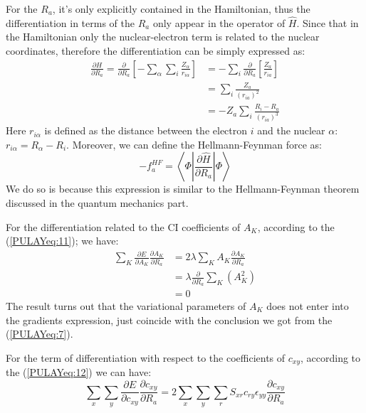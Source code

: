 For the $R_{a}$, it's only explicitly contained in the Hamiltonian,
thus the differentiation in terms of the $R_{a}$ only appear in the
operator of $\hat{H}$. Since that in the Hamiltonian only the
nuclear-electron term is related to the nuclear coordinates, therefore
the differentiation can be simply expressed as:
\begin{align}\label{}
  \frac{\partial \hat{H}}{\partial R_{a}} = \frac{\partial}{\partial
    R_{a}}\left[-\sum_{\alpha}\sum_{i}\frac{Z_{\alpha}}{r_{i\alpha}}\right]
  &=-\sum_{i}\frac{\partial}{\partial
    R_{a}}\left[\frac{Z_{a}}{r_{ia}}\right] \nonumber \\
  &=\sum_{i}\frac{Z_{a}}{(r_{ia})^{2}} \nonumber \\
  &=-Z_{a}\sum_{i}\frac{R_{i} - R_{a}}{(r_{ia})^{3}}
\end{align}
Here $r_{i\alpha}$ is defined as the distance between the electron $i$
and the nuclear $\alpha$: $r_{i\alpha} = R_{\alpha} - R_{i}$.
Moreover, we can define the Hellmann-Feynman force as:
\begin{equation}\label{}
  -f^{HF}_{a} = \left\langle\Phi|\frac{\partial \hat{H}}{\partial
      R_{a}}|\Phi\right\rangle
\end{equation}
We do so is because this expression is similar to the Hellmann-Feynman
theorem discussed in the quantum mechanics part.

For the differentiation related to the CI coefficients of $A_{K}$,
according to the (\ref{PULAYeq:11}); we have:
\begin{align}\label{}
  \sum_{K}\frac{\partial E}{\partial A_{K}}\frac{\partial
    A_{K}}{\partial R_{a}} &=2\lambda\sum_{K}A_{K}\frac{\partial
    A_{K}}{\partial R_{a}} \nonumber \\
  &=\lambda\frac{\partial}{\partial R_{a}}\sum_{K}
  \left(A_{K}^{2}\right)\nonumber \\
  &= 0
\end{align}
The result turns out that the variational parameters of $A_{K}$ does
not enter into the gradients expression, just coincide with the
conclusion we got from the (\ref{PULAYeq:7}).

For the term of differentiation with respect to the coefficients of
$c_{xy}$, according to the (\ref{PULAYeq:12}) we can have:
\begin{equation}\label{PULAYeq:21}
  \sum_{x}\sum_{y}\frac{\partial E}{\partial c_{xy}}\frac{\partial
    c_{xy}}{\partial R_{a}} =
  2\sum_{x}\sum_{y}\sum_{r}S_{xr}c_{ry}\epsilon_{yy}\frac{\partial
    c_{xy}}{\partial R_{a}}
\end{equation}

